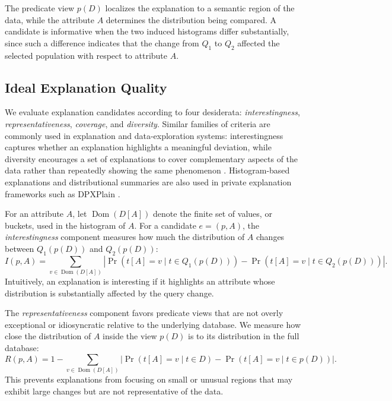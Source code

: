 The predicate view $p(D)$ localizes the explanation to a semantic region of the data, while the attribute $A$ determines the distribution being compared.
A candidate is informative when the two induced histograms differ substantially, since such a difference indicates that the change from $Q_1$ to $Q_2$ affected the selected population with respect to attribute $A$.


\subsection{Ideal Explanation Quality}
\label{sec:explanation-quality}

We evaluate explanation candidates according to four desiderata: \emph{interestingness}, \emph{representativeness}, \emph{coverage}, and \emph{diversity}.
Similar families of criteria are commonly used in explanation and data-exploration systems: interestingness captures whether an explanation highlights a meaningful deviation, while diversity encourages a set of explanations to cover complementary aspects of the data rather than repeatedly showing the same phenomenon \cite{FEDEX}.
Histogram-based explanations and distributional summaries are also used in private explanation frameworks such as DPXPlain \cite{TaoGMR22}.

For an attribute $A$, let $\operatorname{Dom}(D[A])$ denote the finite set of values, or buckets, used in the histogram of $A$.
For a candidate $e=(p,A)$, the \emph{interestingness} component measures how much the distribution of $A$ changes between $Q_1(p(D))$ and $Q_2(p(D))$:
\[
I(p,A)
=
\sum_{v \in \operatorname{Dom}(D[A])}
\left|
\Pr(t[A]=v \mid t \in Q_1(p(D)))
-
\Pr(t[A]=v \mid t \in Q_2(p(D)))
\right|.
\]
Intuitively, an explanation is interesting if it highlights an attribute whose distribution is substantially affected by the query change.

The \emph{representativeness} component favors predicate views that are not overly exceptional or idiosyncratic relative to the underlying database.
We measure how close the distribution of $A$ inside the view $p(D)$ is to its distribution in the full database:
\[
R(p,A)
=
1-
\sum_{v \in \operatorname{Dom}(D[A])}
\left|
\Pr(t[A]=v \mid t \in D)
-
\Pr(t[A]=v \mid t \in p(D))
\right|.
\]
This prevents explanations from focusing on small or unusual regions that may exhibit large changes but are not representative of the data.


